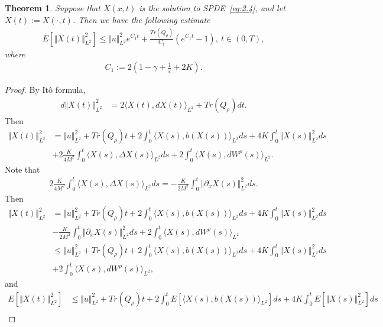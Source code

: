 \documentclass[11pt]{article}
\numberwithin{equation}{section}%
\numberwithin{figure}{section}%
\newtheorem{theorem}{Theorem}[section]
\theoremstyle{remark}
\begin{document}
	\begin{theorem}\label{thm:3.2}
		Suppose that $X(x,t)$ is the solution to SPDE~\eqref{eq:2.4}, and let $X(t):=X(\cdot,t)$. Then we have the following estimate
		\begin{align*}
			E[\Vert X(t) \Vert^{2}_{L^{2}}]\leq \Vert u\Vert _{L^{2}}^{2}e^{C_{1}t}+\frac{Tr(Q_{\rho})}{C_{1}}(e^{C_{1}t}-1), \ t\in(0,T),
		\end{align*}
		where
		\begin{align*}
			C_{1}:=2(1-\gamma+\frac{1}{\varepsilon}+2K).
		\end{align*}
	\end{theorem}
	\begin{proof}
		By It\^{o} formula, 
		\begin{align*}
			d\Vert X(t)\Vert _{L^{2}}^{2}&=2\langle X(t), dX(t)\rangle_{L^{2}}+Tr(Q_{\rho})dt.
		\end{align*}
		Then
		\begin{align*}
			\Vert X(t)\Vert _{L^{2}}^{2}
			&=\Vert u\Vert _{L^{2}}^{2}+Tr(Q_{\rho})t+2\int_{0}^{t}\langle X(s), b(X(s))\rangle_{L^{2}}ds+4K\int_{0}^{t}\Vert X(s)\Vert _{L^{2}}^{2}ds\\
			&+2\frac{K}{4M^{2}}\int_{0}^{t}\langle X(s), \Delta X(s)\rangle_{L^{2}}ds+2\int_{0}^{t}\langle X(s), dW^{\rho}(s)\rangle_{L^{2}}.
		\end{align*}
		Note that
		\begin{align*}
			2\frac{K}{4M^{2}}\int_{0}^{t}\langle X(s), \Delta X(s)\rangle_{L^{2}}ds=-\frac{K}{2M^{2}}\int_{0}^{t}\Vert \partial_{x} X(s)\Vert _{L^{2}}^{2}ds.
		\end{align*}
		Then
		\begin{align*}
			\Vert X(t)\Vert _{L^{2}}^{2}
			&=\Vert u\Vert _{L^{2}}^{2}+Tr(Q_{\rho})t+2\int_{0}^{t}\langle X(s), b(X(s))\rangle_{L^{2}}ds+4K\int_{0}^{t}\Vert X(s)\Vert _{L^{2}}^{2}ds\\
			&-\frac{K}{2M^{2}}\int_{0}^{t}\Vert \partial_{x} X(s)\Vert _{L^{2}}^{2}ds+2\int_{0}^{t}\langle X(s), dW^{\rho}(s)\rangle_{L^{2}}\\
			&\leq \Vert u\Vert _{L^{2}}^{2}+Tr(Q_{\rho})t+2\int_{0}^{t}\langle X(s), b(X(s))\rangle_{L^{2}}ds+4K\int_{0}^{t}\Vert X(s)\Vert _{L^{2}}^{2}ds\\
			&+2\int_{0}^{t}\langle X(s), dW^{\rho}(s)\rangle_{L^{2}}
			,
		\end{align*}
		and
		\begin{align*}
			E[\Vert X(t)\Vert _{L^{2}}^{2}]
			&\leq \Vert u\Vert _{L^{2}}^{2}+Tr(Q_{\rho})t+2\int_{0}^{t}E[\langle X(s), b(X(s))\rangle_{L^{2}}]ds+4K\int_{0}^{t}E[\Vert X(s)\Vert _{L^{2}}^{2}]ds\\

\end{align*}
\end{proof}
\end{document}
